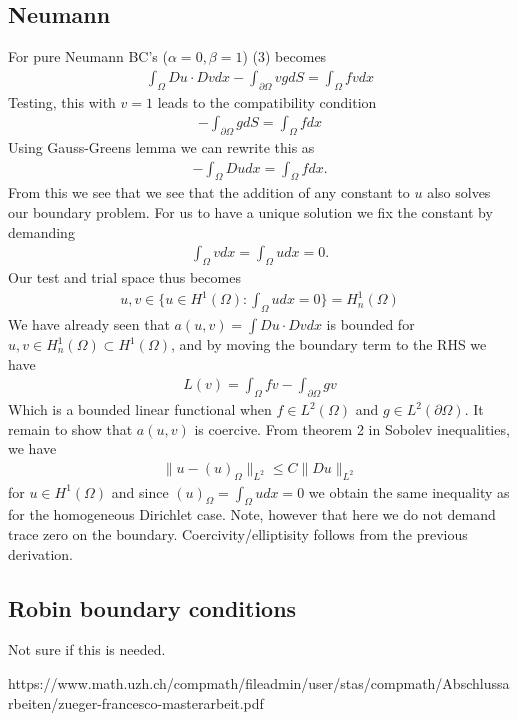 \documentclass[11pt, norsk, a4paper]{article}
\newcommand\norm[1]{\lVert#1\rVert}
\begin{document}
\subsection*{Neumann}
For pure Neumann BC's ($\alpha = 0, \beta = 1$) (3) becomes 
\begin{align*}
     \int_\Omega D u \cdot D v dx -\int_{\partial \Omega} vg dS = \int_\Omega fv dx
\end{align*}
Testing, this with $v = 1$ leads to the compatibility condition 
\begin{align*}
    -\int_{\partial \Omega} g dS = \int_\Omega f dx
\end{align*}
Using Gauss-Greens lemma we can rewrite this as 
\begin{align*}
    -\int_\Omega Du dx = \int_\Omega f dx.
\end{align*}
From this we see that we see that the addition of any constant to $u$ also solves our boundary problem. For us to have a unique solution we fix the constant by demanding 
\begin{align*}
    \int_\Omega v dx = \int_\Omega u dx = 0.
\end{align*}
Our test and trial space thus becomes 
\begin{align*}
    u,v \in \{u \in H^1(\Omega) : \int_\Omega u dx = 0\} = H^1_n(\Omega)
\end{align*}
We have already seen that $a(u,v) = \int Du \cdot Dv dx$ is bounded for $u,v \in H^1_n(\Omega) \subset H^1(\Omega)$, and by moving the boundary term to the RHS we have 
\begin{align*}
    L(v) = \int_\Omega fv -\int_{\partial \Omega}gv
\end{align*}
Which is a bounded linear functional when $f \in L^2(\Omega)$ and $g \in L^2(\partial \Omega)$. It remain to show that $a(u,v)$ is coercive. From theorem 2 in Sobolev inequalities, we have 
\begin{align*}
    \norm{u-(u)_\Omega}_{L^2} \leq C\norm{Du}_{L^2}
\end{align*}
for $u \in H^1(\Omega)$ and since $(u)_\Omega =\int_\Omega u dx = 0 $ we obtain the same inequality as for the homogeneous Dirichlet case. Note, however that here we do not demand trace zero on the boundary. Coercivity/elliptisity follows from the previous derivation.  
\subsection*{Robin boundary conditions}
Not sure if this is needed. 


\begin{thebibliography}{9}




\end{thebibliography}

{https://www.math.uzh.ch/compmath/fileadmin/user/stas/compmath/Abschlussarbeiten/zueger-francesco-masterarbeit.pdf}
\end{document}

